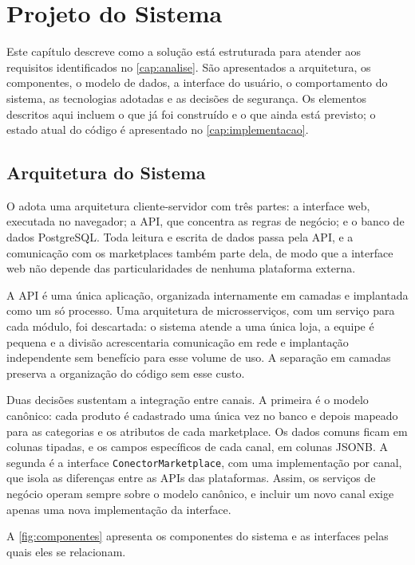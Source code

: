 \chapter{Projeto do Sistema}
\label{cap:projeto}

Este capítulo descreve como a solução está estruturada para atender aos requisitos identificados no \autoref{cap:analise}. São apresentados a arquitetura, os componentes, o modelo de dados, a interface do usuário, o comportamento do sistema, as tecnologias adotadas e as decisões de segurança. Os elementos descritos aqui incluem o que já foi construído e o que ainda está previsto; o estado atual do código é apresentado no \autoref{cap:implementacao}.

\section{Arquitetura do Sistema}

O \sistema{} adota uma arquitetura cliente-servidor com três partes: a interface web, executada no navegador; a API, que concentra as regras de negócio; e o banco de dados PostgreSQL. Toda leitura e escrita de dados passa pela API, e a comunicação com os marketplaces também parte dela, de modo que a interface web não depende das particularidades de nenhuma plataforma externa.

A API é uma única aplicação, organizada internamente em camadas e implantada como um só processo. Uma arquitetura de microsserviços, com um serviço para cada módulo, foi descartada: o sistema atende a uma única loja, a equipe é pequena e a divisão acrescentaria comunicação em rede e implantação independente sem benefício para esse volume de uso. A separação em camadas preserva a organização do código sem esse custo.

Duas decisões sustentam a integração entre canais. A primeira é o modelo canônico: cada produto é cadastrado uma única vez no banco e depois mapeado para as categorias e os atributos de cada marketplace. Os dados comuns ficam em colunas tipadas, e os campos específicos de cada canal, em colunas JSONB. A segunda é a interface \texttt{ConectorMarketplace}, com uma implementação por canal, que isola as diferenças entre as APIs das plataformas. Assim, os serviços de negócio operam sempre sobre o modelo canônico, e incluir um novo canal exige apenas uma nova implementação da interface.

A \autoref{fig:componentes} apresenta os componentes do sistema e as interfaces pelas quais eles se relacionam.

